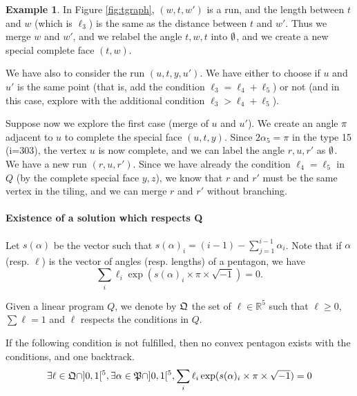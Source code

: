 \documentclass[11pt]{article}
\theoremstyle{definition}
\newtheorem*{example}{Example}
\begin{document}
\begin{example}
In Figure \ref{fig:tgraph}, $(w,t,w')$ is a run, and the length between $t$ and $w$ (which is $\ell_3$) is the same as the distance between $t$ and $w'$. Thus we merge $w$ and $w'$, and we relabel the angle $t,w,t$ into $\emptyset$, and we create a new special complete face $(t,w)$.

We have also to consider the run $(u,t,y,u')$. We have either to choose if $u$ and $u'$ is the same point (that is, add the condition $\ell_3=\ell_4+\ell_5$) or not (and in this case, explore with the additional condition $\ell_3>\ell_4+\ell_5$).

Suppose now we explore the first case (merge of $u$ and $u'$). We create an angle $\pi$ adjacent to $u$ to complete the special face $(u,t,y)$. Since $2\alpha_5=\pi$ in the type 15 (i=303), the vertex $u$ is now complete, and we can label the angle $r,u,r'$ as $\emptyset$. We have a new run $(r,u,r')$. Since we have already the condition $\ell_4=\ell_5$ in $Q$ (by the complete special face $y,z$), we know that $r$ and $r'$ must be the same vertex in the tiling, and we can merge $r$ and $r'$ without branching.
\end{example}

%
%

%
%

\paragraph{Existence of a solution which respects Q}

Let $s(\alpha)$ be the vector such that $s(\alpha)_i=(i-1) -\sum_{j=1}^{i-1} \alpha_i$.
Note that if $\alpha$ (resp. $\ell$) is the vector of angles (resp. lengths) of a pentagon, we have
\begin{equation}\label{eq:eq}
\sum_i \ell_i \exp(s(\alpha)_i \times \pi \times \sqrt{-1} )=0.
\end{equation}

Given a linear program $Q$, we denote by $\mathfrak{Q}$ the set of $\ell\in\mathbb{R}^5$ such that $\ell\ge 0$, $\sum \ell=1$ and $\ell$ respects the conditions in $Q$.


%
If the following condition is not fulfilled, then no convex pentagon exists with the conditions, and one backtrack.
\begin{equation}\label{eq:nopoly}
  \exists \ell\in \mathfrak{Q} \cap ]0,1[^5, \exists \alpha\in\mathfrak{P} \cap ]0,1[^5, \sum_i \ell_i \exp(s(\alpha)_i\times \pi \times \sqrt{-1})= 0
\end{equation}
\end{document}
